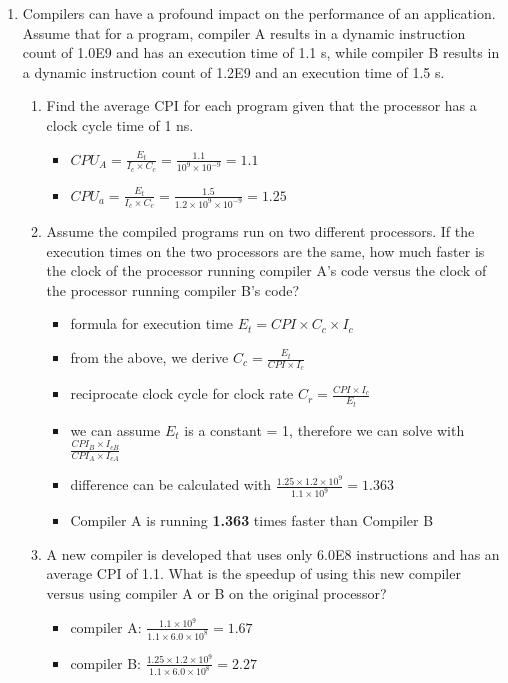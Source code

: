 \documentclass[10pt]{article}
\begin{document}
\begin{enumerate}
    \item Compilers can have a profound impact on the performance of an application. Assume that for a program, compiler A results in a dynamic instruction count of 1.0E9 and has an execution time of 1.1 s, while compiler B results in a dynamic instruction count of 1.2E9 and an execution time of 1.5 s.
    \begin{enumerate}
        \item Find the average CPI for each program given that the processor has a clock cycle time of 1 ns.
        \begin{itemize}
            \item $CPU_A = \frac{E_t}{I_c \times C_c} = \frac{1.1}{10^9 \times 10^{-9}} = 1.1$
            \item $CPU_a = \frac{E_t}{I_c \times C_c} = \frac{1.5}{1.2\times10^9\times10^{-9}} = 1.25$
        \end{itemize}
        \item Assume the compiled programs run on two different processors. If the execution times on the two processors are the same, how much faster is the clock of the processor running compiler A's code versus the clock of the processor running compiler B's code?
        \begin{itemize}
            \item formula for execution time $E_t = CPI \times C_c \times I_c$
            \item from the above, we derive $C_c = \frac{E_t}{CPI \times I_c}$
            \item reciprocate clock cycle for clock rate $C_r = \frac{CPI \times I_c}{E_t}$
            \item we can assume $E_t$ is a constant = 1, therefore we can solve with $\frac{CPI_B \times I_{cB}}{CPI_A \times I_{cA}}$
            \item difference can be calculated with $\frac{1.25 \times 1.2 \times 10^9}{1.1 \times 10^9} = 1.363$
            \item Compiler A is running \textbf{1.363} times faster than Compiler B
        \end{itemize}
        \item A new compiler is developed that uses only 6.0E8 instructions and has an average CPI of 1.1. What is the speedup of using this new compiler versus using compiler A or B on the original processor?
        \begin{itemize}
            \item compiler A: $\frac{1.1 \times 10^9}{1.1 \times 6.0 \times 10^8} = 1.67$
            \item compiler B: $\frac{1.25 \times 1.2 \times 10^9}{1.1 \times 6.0 \times 10^8} = 2.27$
        \end{itemize}
    \end{enumerate}
    

\end{enumerate}
\end{document}
